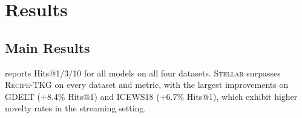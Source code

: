 \documentclass[10pt,twocolumn]{article}
\theoremstyle{definition}
\newcommand{\recipe}{\textsc{Recipe-TKG}}
\begin{document}
\section{Results}
\label{sec:results}

\subsection{Main Results}

 reports Hits@1/3/10 for all models on all four datasets.
\textsc{Stellar} surpasses \recipe{} on every dataset and metric, with the largest
improvements on GDELT (+8.4\% Hits@1) and ICEWS18 (+6.7\% Hits@1), which
exhibit higher novelty rates in the streaming setting.
\end{document}
